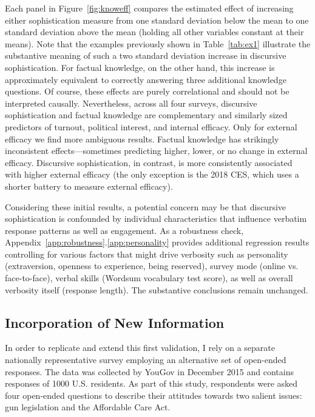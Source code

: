 Each panel in Figure~\ref{fig:knoweff} compares the estimated effect of increasing either sophistication measure from one standard deviation below the mean to one standard deviation above the mean (holding all other variables constant at their means). Note that the examples previously shown in Table~\ref{tab:ex1} illustrate the substantive meaning of such a two standard deviation increase in discursive sophistication. For factual knowledge, on the other hand, this increase is approximately equivalent to correctly answering three additional knowledge questions. Of course, these effects are purely correlational and should not be interpreted causally. Nevertheless, across all four surveys, discursive sophistication and factual knowledge are complementary and similarly sized predictors of turnout, political interest, and internal efficacy. Only for external efficacy we find more ambiguous results. Factual knowledge has strikingly inconsistent effects---sometimes predicting higher, lower, or no change in external efficacy. Discursive sophistication, in contrast, is more consistently associated with higher external efficacy (the only exception is the 2018 CES, which uses a shorter battery to measure external efficacy).

Considering these initial results, a potential concern may be that discursive sophistication is confounded by individual characteristics that influence verbatim response patterns as well as engagement. As a robustness check, Appendix~\ref{app:robustness}.\ref{app:personality} provides additional regression results controlling for various factors that might drive verbosity such as personality (extraversion, openness to experience, being reserved), survey mode (online vs. face-to-face), verbal skills (Wordsum vocabulary test score), as well as overall verbosity itself (response length). The substantive conclusions remain unchanged.


\subsection*{Incorporation of New Information}
In order to replicate and extend this first validation, I rely on a separate nationally representative survey employing an alternative set of open-ended responses. The data was collected by YouGov in December 2015 and contains responses of 1000 U.S. residents. %
As part of this study, respondents were asked four open-ended questions to describe their attitudes towards two salient issues: gun legislation and the Affordable Care Act.

